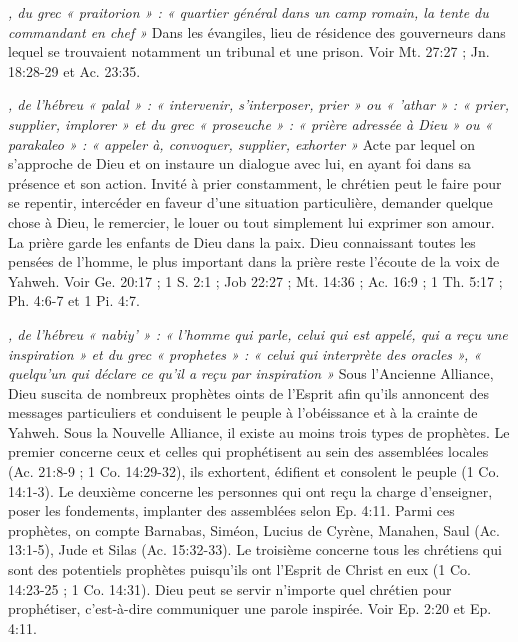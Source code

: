 \begin{multicols}{2}
\textit{, du grec « praitorion » : « quartier général dans un camp romain, la tente du commandant en chef »}\newline
Dans les évangiles, lieu de résidence des gouverneurs dans lequel se trouvaient notamment un tribunal et une prison. Voir Mt. 27:27 ; Jn. 18:28-29 et Ac. 23:35.

\textit{, de l'hébreu « palal » : « intervenir, s'interposer, prier » ou « 'athar » : « prier, supplier, implorer » et du grec « proseuche » : « prière adressée à Dieu » ou « parakaleo » : « appeler à, convoquer, supplier, exhorter »}\newline
Acte par lequel on s'approche de Dieu et on instaure un dialogue avec lui, en ayant foi dans sa présence et son action. Invité à prier constamment, le chrétien peut le faire pour se repentir, intercéder en faveur d'une situation particulière, demander quelque chose à Dieu, le remercier, le louer ou tout simplement lui exprimer son amour. La prière garde les enfants de Dieu dans la paix. Dieu connaissant toutes les pensées de l'homme, le plus important dans la prière reste l'écoute de la voix de Yahweh. Voir Ge. 20:17 ; 1 S. 2:1 ; Job 22:27 ; Mt. 14:36 ; Ac. 16:9 ; 1 Th. 5:17 ; Ph. 4:6-7 et 1 Pi. 4:7.

\textit{, de l'hébreu « nabiy' » : « l'homme qui parle, celui qui est appelé, qui a reçu une inspiration » et du grec « prophetes » : « celui qui interprète des oracles », « quelqu'un qui déclare ce qu'il a reçu par inspiration »}\newline
Sous l'Ancienne Alliance, Dieu suscita de nombreux prophètes oints de l'Esprit afin qu'ils annoncent des messages particuliers et conduisent le peuple à l'obéissance et à la crainte de Yahweh. Sous la Nouvelle Alliance, il existe au moins trois types de prophètes. Le premier concerne ceux et celles qui prophétisent au sein des assemblées locales (Ac. 21:8-9 ; 1 Co. 14:29-32), ils exhortent, édifient et consolent le peuple (1 Co. 14:1-3). Le deuxième concerne les personnes qui ont reçu la charge d'enseigner, poser les fondements, implanter des assemblées selon Ep. 4:11. Parmi ces prophètes, on compte Barnabas, Siméon, Lucius de Cyrène, Manahen, Saul (Ac. 13:1-5), Jude et Silas (Ac. 15:32-33). Le troisième concerne tous les chrétiens qui sont des potentiels prophètes puisqu'ils ont l'Esprit de Christ en eux (1 Co. 14:23-25 ; 1 Co. 14:31). Dieu peut se servir n'importe quel chrétien pour prophétiser, c'est-à-dire communiquer une parole inspirée. Voir Ep. 2:20 et Ep. 4:11.


\end{multicols}
